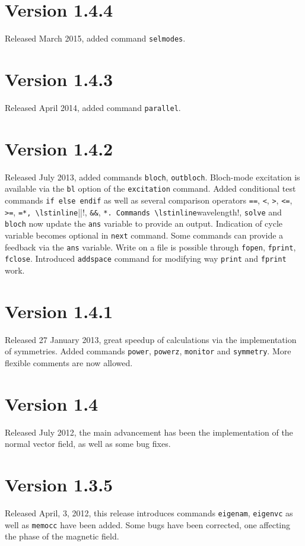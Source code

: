 \section{Version 1.4.4}
Released March 2015, added command \lstinline!selmodes!.

\section{Version 1.4.3}
Released April 2014, added command \lstinline!parallel!.

\section{Version 1.4.2}
Released July 2013, added commands \lstinline!bloch!, \lstinline!outbloch!. Bloch-mode excitation is available via the \lstinline!bl! option of the \lstinline!excitation! command. Added conditional test commands \lstinline!if else endif! as well as several comparison operators \lstinline!==!, \lstinline!<!, \lstinline!>!, \lstinline!<=!, \lstinline!>=!, \lstinline*!=*, \lstinline!||!, \lstinline!&&!, \lstinline*!*. Commands \lstinline!wavelength!, \lstinline!solve! and \lstinline!bloch! now update the \lstinline!ans! variable to provide an output. Indication of cycle variable becomes optional in \lstinline!next! command. Some commands can provide a feedback via the \lstinline!ans! variable. Write on a file is possible through \lstinline!fopen!, \lstinline!fprint!, \lstinline!fclose!. Introduced \lstinline!addspace! command for modifying way \lstinline!print! and \lstinline!fprint! work.

\section{Version 1.4.1}
Released 27 January 2013, great speedup of calculations via the implementation of symmetries. Added commands \lstinline!power!, \lstinline!powerz!, \lstinline!monitor! and \lstinline!symmetry!. More flexible comments are now allowed.

\section{Version 1.4}
Released July 2012, the main advancement has been the implementation of the normal vector field, as well as some bug fixes.

\section{Version 1.3.5}
Released April, 3, 2012, this release introduces commands \lstinline!eigenam!, \lstinline!eigenvc! as well as \lstinline!memocc! have been added. Some bugs have been corrected, one affecting the phase of the magnetic field.


